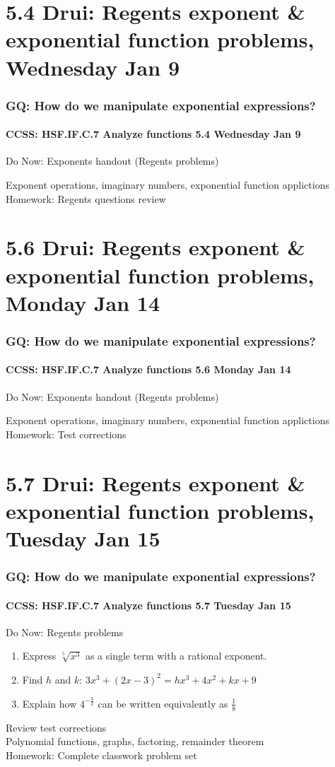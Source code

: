 \documentclass{beamer}
\begin{document}
  \section{5.4 Drui: Regents exponent \& exponential function problems, Wednesday Jan 9}
    \frame
    {
      \frametitle{GQ: How do we manipulate exponential expressions?}
      \framesubtitle{CCSS: HSF.IF.C.7 Analyze functions    \alert{5.4 Wednesday Jan 9}}

      \begin{block}{Do Now: Exponents handout (Regents problems)}
      \end{block}
      Exponent operations, imaginary numbers, exponential function applictions \\ \bigskip
      Homework: Regents questions review
    }

  \section{5.6 Drui: Regents exponent \& exponential function problems, Monday Jan 14}
    \frame
    {
      \frametitle{GQ: How do we manipulate exponential expressions?}
      \framesubtitle{CCSS: HSF.IF.C.7 Analyze functions    \alert{5.6 Monday Jan 14}}

      \begin{block}{Do Now: Exponents handout (Regents problems)}
      \end{block}
      Exponent operations, imaginary numbers, exponential function applictions \\ \bigskip
      Homework: Test corrections
    }

  \section{5.7 Drui: Regents exponent \& exponential function problems, Tuesday Jan 15}
    \frame
    {
      \frametitle{GQ: How do we manipulate exponential expressions?}
      \framesubtitle{CCSS: HSF.IF.C.7 Analyze functions    \alert{5.7 Tuesday Jan 15}}

      \begin{block}{Do Now: Regents problems}
        \begin{enumerate}
          \item Express $\sqrt[5]{x^3}$ as a single term with a rational exponent.
          \item Find $h$ and $k$: $3x^3+(2x-3)^2=hx^3+4x^2+kx+9$
          \item Explain how $\displaystyle 4^{-\frac{3}{2}}$ can be written equivalently as $\frac{1}{8}$
        \end{enumerate}
      \end{block}
      Review test corrections\\
      Polynomial functions, graphs, factoring, remainder theorem \\ \bigskip
      Homework: Complete classwork problem set
    }
\end{document}
